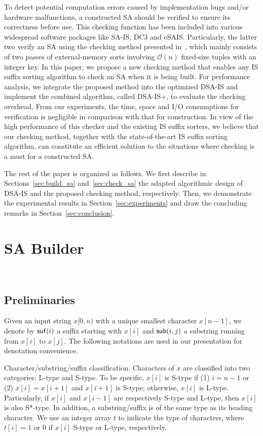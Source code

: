 \documentclass[10pt,journal,compsoc]{IEEEtran}
\begin{document}
To detect potential computation errors caused by implementation bugs and/or hardware malfunctions, a constructed SA should be verified to ensure its correctness before use. This checking function has been included into various widespread software packages like SA-IS, DC3 and eSAIS. Particularly, the latter two verify an SA using the checking method presented in~\cite{Dementiev2008a}, which mainly consists of two passes of external-memory sorts involving $\mathcal{O}(n)$ fixed-size tuples with an integer key. In this paper, we propose a new checking method that enables any IS suffix sorting algorithm to check an SA when it is being built. 
For performance analysis, we integrate the proposed method into the optimized DSA-IS and implement the combined algorithm, called DSA-IS+, to evaluate the checking overhead. From our experiments, the time, space and I/O consumptions for verification is negligible in comparison with that for construction. In view of the high performance of this checker and the existing IS suffix sorters, we believe that our checking method, together with the state-of-the-art IS suffix sorting algorithm, can constitute an efficient solution to the situations where checking is a must for a constructed SA.

The rest of the paper is organized as follows. We first describe in Sections~\ref{sec:build_sa} and~\ref{sec:check_sa} the adapted algorithmic design of DSA-IS and the proposed checking method, respectively. Then, we demonstrate the experimental results in Section~\ref{sec:experiments} and draw the concluding remarks in Section~\ref{sec:conclusion}.


\section{SA Builder}~\label{sec:build_sa}

\subsection{Preliminaries}

Given an input string $x[0, n)$ with a unique smallest character $x[n - 1]$, we denote by ${\sf suf}(i)$ a suffix starting with $x[i]$ and ${\sf sub}(i,j)$ a substring running from $x[i]$ to $x[j]$. The following notations are used in our presentation for denotation convenience.

Character/substring/suffix classification. Characters of $x$ are classified into two categories: L-type and S-type. To be specific, $x[i]$ is S-type if (1) $i = n - 1$ or (2) $x[i] = x[i + 1]$ and $x[i + 1]$ is S-type; otherwise, $x[i]$ is L-type. Particularly, if $x[i]$ and $x[i - 1]$ are respectively S-type and L-type, then $x[i]$ is also S*-type. In addition, a substring/suffix is of the same type as its heading character. We use an integer array $t$ to indicate the type of characters, where $t[i] = 1$ or $0$ if $x[i] $ S-type or L-type, respectively.
\end{document}
